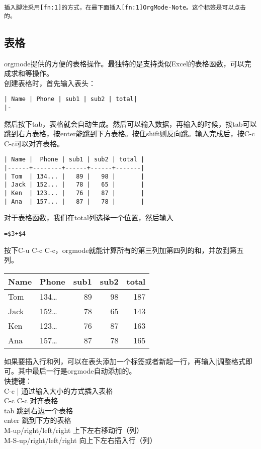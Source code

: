 \documentclass[11pt]{article}
\begin{document}
\begin{verbatim}
插入脚注采用[fn:1]的方式，在最下面插入[fn:1]OrgMode-Note。这个标签是可以点击的。
\end{verbatim}

\subsection{表格}
\label{sec-1-4}

orgmode提供的方便的表格操作。最独特的是支持类似Excel的表格函数，可以完成求和等操作。\\
创建表格时，首先输入表头：
\begin{verbatim}
| Name | Phone | sub1 | sub2 | total|
|-
\end{verbatim}
然后按下tab，表格就会自动生成。然后可以输入数据，再输入的时候，按tab可以跳到右方表格，按enter能跳到下方表格。按住shift则反向跳。输入完成后，按C-c C-c可以对齐表格。
\begin{verbatim}
| Name |  Phone | sub1 | sub2 | total |
|------+--------+------+------+-------|
| Tom  | 134... |   89 |   98 |       |
| Jack | 152... |   78 |   65 |       |
| Ken  | 123... |   76 |   87 |       |
| Ana  | 157... |   87 |   78 |       |
\end{verbatim}
对于表格函数，我们在total列选择一个位置，然后输入
\begin{verbatim}
=$3+$4
\end{verbatim}
按下C-u C-c C-c，orgmode就能计算所有的第三列加第四列的和，并放到第五列。
\begin{center}
\begin{tabular}{llrrr}
Name & Phone & sub1 & sub2 & total\\
\hline
Tom & 134\ldots{} & 89 & 98 & 187\\
Jack & 152\ldots{} & 78 & 65 & 143\\
Ken & 123\ldots{} & 76 & 87 & 163\\
Ana & 157\ldots{} & 87 & 78 & 165\\
\end{tabular}
\end{center}
如果要插入行和列，可以在表头添加一个标签或者新起一行，再输入|调整格式即可。其中最后一行是orgmode自动添加的。\\
快捷键：\\
C-c | 通过输入大小的方式插入表格\\
C-c C-c 对齐表格\\
tab 跳到右边一个表格 \\
enter 跳到下方的表格 \\
M-up/right/left/right 上下左右移动行（列）\\
M-S-up/right/left/right 向上下左右插入行（列）\\
\end{document}
